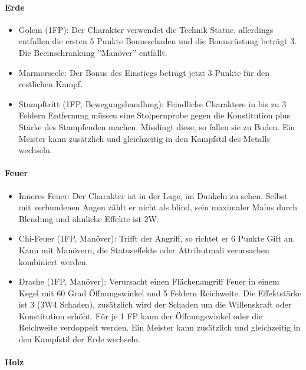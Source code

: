 \documentclass{article}
\begin{document}
\paragraph{Erde}

\begin{itemize}
\item Golem (1FP): Der Charakter verwendet die Technik Statue, allerdings entfallen die ersten 5 Punkte Bonusschaden und die Bonusrüstung beträgt 3. Die Beeinschränkung ''Manöver'' entfällt.
\item Marmorseele: Der Bonus des Einstiegs beträgt jetzt 3 Punkte für den restlichen Kampf.
\item Stampftritt (1FP, Bewegungshandlung): Feindliche Charaktere in bis zu 3 Feldern Entfernung müssen eine Stolpernprobe gegen die Konstitution plus Stärke des Stampfenden machen. Misslingt diese, so fallen sie zu Boden. Ein Meister kann zusätzlich und gleichzeitig in den Kampfstil des Metalls wechseln.
\end{itemize}

\paragraph{Feuer}

\begin{itemize}
\item Inneres Feuer: Der Charakter ist in der Lage, im Dunkeln zu sehen. Selbst mit verbundenen Augen zählt er nicht als blind, sein maximaler Malus durch Blendung und ähnliche Effekte ist 2W.
\item Chi-Feuer (1FP, Manöver): Trifft der Angriff, so richtet er 6 Punkte Gift an. Kann mit Manövern, die Statuseffekte oder Attributmali verursachen kombiniert werden.
\item Drache (1FP, Manöver): Verursacht einen Flächenangriff Feuer in einem Kegel mit 60 Grad Öffnungswinkel und 5 Feldern Reichweite. Die Effektstärke ist 3 (3W4 Schaden), zusätzlich wird der Schaden um die Willenskraft oder Konstitution erhöht. Für je 1 FP kann der Öffnungswinkel oder die Reichweite verdoppelt werden. Ein Meister kann zusätzlich und gleichzeitig in den Kampfstil der Erde wechseln.
\end{itemize}

\paragraph{Holz}
\end{document}
